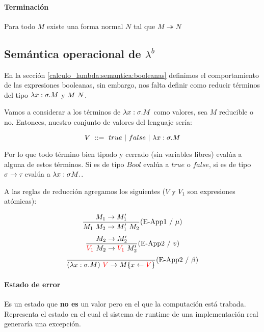 \paragraph{Terminación}
Para todo $M$ existe una forma normal $N$ tal que $M\twoheadrightarrow N$


\subsection{Semántica operacional de \texorpdfstring{$\lambda^b$}{lambda b}}
En la sección \ref{calculo_lambda:semantica:booleanas} definimos el comportamiento de las expresiones booleanas, sin embargo, nos falta definir como reducir términos del tipo $\lambda x: \sigma . M$ y $M~N$.

Vamos a considerar a los términos de $\lambda x: \sigma . M$ como valores, sea $M$ reducible o no. Entonces, nuestro conjunto de valores del lenguaje sería:

$$ V  ~::=~ true~|~false~|~\lambda x: \sigma . M$$

Por lo que todo término bien tipado y cerrado (sin variables libres) evalúa a alguna de estos términos. Si es de tipo $Bool$ evalúa a $true$ o $false$, si es de tipo $\sigma\to\tau$ evalúa a $\lambdaAbs{x}{\sigma{M}}$.

A las reglas de reducción agregamos los siguientes ($V$ y $V_1$ son expresiones atómicas):

\begin{equation*}
	\frac{M_1\to M'_1}{M_1~M_2 \to 
		M'_1~M_2}(\text{E-App1}~ /~ \mu)
\end{equation*}
\vspace*{5mm}
\begin{equation*}
	\frac{M_2 \to M'_2}{\color{red}V_1\color{black}~M_2 \to 
		\color{red}V_1\color{black}~M'_2}(\text{E-App2}~/~v)
\end{equation*}	
\vspace*{5mm}
\begin{equation*}
	\frac{}{(\lambda x: \sigma . M)~\color{red}V\color{black} \to 
		M\{x\leftarrow\color{red}V\color{black}\}}(\text{E-App2}~/~\beta)
\end{equation*}

\paragraph{Estado de error} Es un estado que \textbf{no es} un valor pero en el que la computación está trabada. Representa el estado en el cual el sistema de runtime de una implementación real generaría una excepción.

